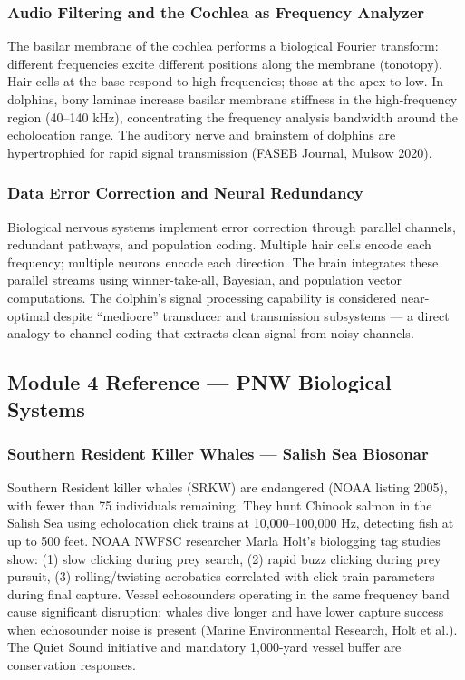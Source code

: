 \documentclass[11pt,letterpaper]{article}
\begin{document}
\subsubsection{Audio Filtering and the Cochlea as Frequency Analyzer}
The basilar membrane of the cochlea performs a biological Fourier transform: different frequencies excite different positions along the membrane (tonotopy). Hair cells at the base respond to high frequencies; those at the apex to low. In dolphins, bony laminae increase basilar membrane stiffness in the high-frequency region (40--140 kHz), concentrating the frequency analysis bandwidth around the echolocation range. The auditory nerve and brainstem of dolphins are hypertrophied for rapid signal transmission (FASEB Journal, Mulsow 2020).

\subsubsection{Data Error Correction and Neural Redundancy}
Biological nervous systems implement error correction through parallel channels, redundant pathways, and population coding. Multiple hair cells encode each frequency; multiple neurons encode each direction. The brain integrates these parallel streams using winner-take-all, Bayesian, and population vector computations. The dolphin's signal processing capability is considered near-optimal despite ``mediocre'' transducer and transmission subsystems --- a direct analogy to channel coding that extracts clean signal from noisy channels.

\subsection{Module 4 Reference --- PNW Biological Systems}

\subsubsection{Southern Resident Killer Whales --- Salish Sea Biosonar}
Southern Resident killer whales (SRKW) are endangered (NOAA listing 2005), with fewer than 75 individuals remaining. They hunt Chinook salmon in the Salish Sea using echolocation click trains at 10,000--100,000 Hz, detecting fish at up to 500 feet. NOAA NWFSC researcher Marla Holt's biologging tag studies show: (1) slow clicking during prey search, (2) rapid buzz clicking during prey pursuit, (3) rolling/twisting acrobatics correlated with click-train parameters during final capture. Vessel echosounders operating in the same frequency band cause significant disruption: whales dive longer and have lower capture success when echosounder noise is present (Marine Environmental Research, Holt et al.). The Quiet Sound initiative and mandatory 1,000-yard vessel buffer are conservation responses.
\end{document}
